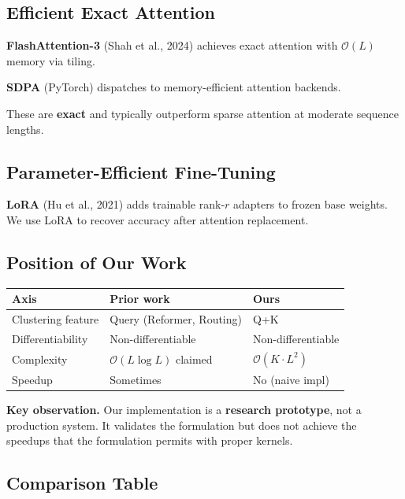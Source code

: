 \subsection{Efficient Exact Attention}

\textbf{FlashAttention-3} (Shah et al., 2024) achieves exact attention with 
$\mathcal{O}(L)$ memory via tiling.

\textbf{SDPA} (PyTorch) dispatches to memory-efficient attention backends.

These are \textbf{exact} and typically outperform sparse attention at moderate 
sequence lengths.

\subsection{Parameter-Efficient Fine-Tuning}

\textbf{LoRA} (Hu et al., 2021) adds trainable rank-$r$ adapters to frozen base 
weights. We use LoRA to recover accuracy after attention replacement.

\subsection{Position of Our Work}

\begin{table}[H]
\centering
\small
\begin{tabular}{lll}
\toprule
\textbf{Axis} & \textbf{Prior work} & \textbf{Ours} \\
\midrule
Clustering feature & Query (Reformer, Routing) & Q+K \\
Differentiability & Non-differentiable & Non-differentiable \\
Complexity & $\mathcal{O}(L \log L)$ claimed & $\mathcal{O}(K \cdot L^2)$ \\
Speedup & Sometimes & No (naive impl) \\
\bottomrule
\end{tabular}
\end{table}

\textbf{Key observation.} Our implementation is a \textbf{research prototype}, not a 
production system. It validates the formulation but does not achieve the 
speedups that the formulation permits with proper kernels.



\subsection{Comparison Table}


